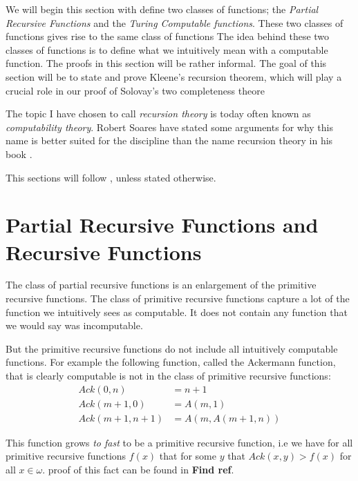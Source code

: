 \documentclass[../main.tex]{subfiles}
\begin{document}
We will begin this section with define two classes of functions;
the \textit{Partial Recursive Functions} and  the \textit{Turing Computable
functions}. These two classes of functions gives rise to the same class of
functions The idea behind these two classes of functions is to define what
we intuitively mean with a computable function. The proofs in this section will
be rather informal. The goal of this section will be to state and prove
Kleene's recursion theorem, which will play a crucial role in our proof of 
Solovay's two  completeness theore

The topic I have chosen to call \textit{recursion theory} is today often known as
\textit{computability theory}. Robert Soares have stated some arguments for why this
name is better suited for the discipline than the name recursion theory in his
book \parencite{Soare2016}.

This sections will follow \parencite{Soare1987}, unless stated otherwise. 

\section{Partial Recursive Functions and Recursive Functions}
The class of partial recursive functions is an enlargement of the primitive recursive
functions. The class of primitive recursive functions capture a lot of the
function we intuitively sees as computable. It does not contain any function that
we would say was incomputable.

But the primitive recursive functions do not include all intuitively computable
functions. For example the following function, called the Ackermann function,  that is clearly computable is not
in the class of primitive recursive functions:
\begin{align*}
	Ack(0,n)&=n+1\\
	Ack(m+1,0)&=A(m,1)\\
	Ack(m+1,n+1)&=A(m,A(m+1,n))
\end{align*}

This function grows \textit{to fast} to be a primitive recursive function, i.e
we have for all primitive recursive functions $f(x)$ that for some $y$ that
$Ack(x,y)>f(x)$ for all $x\in \omega$. 
proof of this fact can be found in \textbf{Find ref}.
\end{document}
